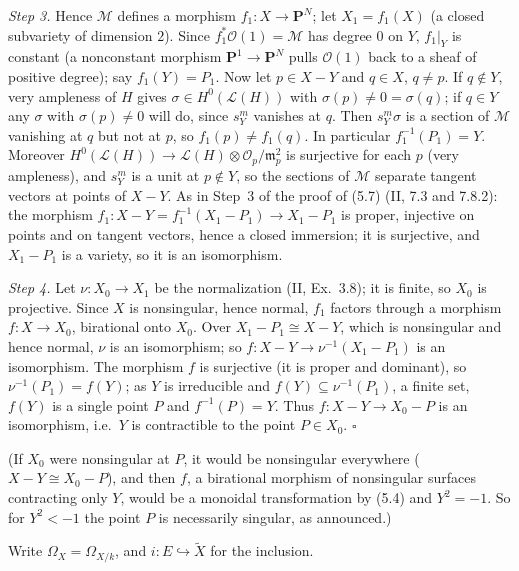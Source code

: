 \documentclass[11pt]{article}
\begin{document}
\emph{Step 3.} Hence $\mathcal M$ defines a morphism $f_1:X\to\mathbf P^N$; let $X_1=f_1(X)$ (a closed subvariety of dimension $2$). Since $f_1^*\mathcal O(1)=\mathcal M$ has degree $0$ on $Y$, $f_1|_Y$ is constant (a nonconstant morphism $\mathbf P^1\to\mathbf P^N$ pulls $\mathcal O(1)$ back to a sheaf of positive degree); say $f_1(Y)=P_1$. Now let $p\in X-Y$ and $q\in X$, $q\ne p$. If $q\notin Y$, very ampleness of $H$ gives $\sigma\in H^0(\mathcal L(H))$ with $\sigma(p)\ne0=\sigma(q)$; if $q\in Y$ any $\sigma$ with $\sigma(p)\ne0$ will do, since $s_Y^m$ vanishes at $q$. Then $s_Y^m\sigma$ is a section of $\mathcal M$ vanishing at $q$ but not at $p$, so $f_1(p)\ne f_1(q)$. In particular $f_1^{-1}(P_1)=Y$. Moreover $H^0(\mathcal L(H))\to\mathcal L(H)\otimes\mathcal O_p/\mathfrak m_p^2$ is surjective for each $p$ (very ampleness), and $s_Y^m$ is a unit at $p\notin Y$, so the sections of $\mathcal M$ separate tangent vectors at points of $X-Y$. As in Step~3 of the proof of (5.7) (II, 7.3 and 7.8.2): the morphism $f_1:X-Y=f_1^{-1}(X_1-P_1)\to X_1-P_1$ is proper, injective on points and on tangent vectors, hence a closed immersion; it is surjective, and $X_1-P_1$ is a variety, so it is an isomorphism.

\emph{Step 4.} Let $\nu:X_0\to X_1$ be the normalization (II, Ex.~3.8); it is finite, so $X_0$ is projective. Since $X$ is nonsingular, hence normal, $f_1$ factors through a morphism $f:X\to X_0$, birational onto $X_0$. Over $X_1-P_1\cong X-Y$, which is nonsingular and hence normal, $\nu$ is an isomorphism; so $f:X-Y\to\nu^{-1}(X_1-P_1)$ is an isomorphism. The morphism $f$ is surjective (it is proper and dominant), so $\nu^{-1}(P_1)=f(Y)$; as $Y$ is irreducible and $f(Y)\subseteq\nu^{-1}(P_1)$, a finite set, $f(Y)$ is a single point $P$ and $f^{-1}(P)=Y$. Thus $f:X-Y\to X_0-P$ is an isomorphism, i.e.\ $Y$ is contractible to the point $P\in X_0$. \hfill$\square$

(If $X_0$ were nonsingular at $P$, it would be nonsingular everywhere ($X-Y\cong X_0-P$), and then $f$, a birational morphism of nonsingular surfaces contracting only $Y$, would be a monoidal transformation by (5.4) and $Y^2=-1$. So for $Y^2<-1$ the point $P$ is necessarily singular, as announced.)

\pf
Write $\Omega_X=\Omega_{X/k}$, and $i:E\hookrightarrow\widetilde X$ for the inclusion.
\end{document}
